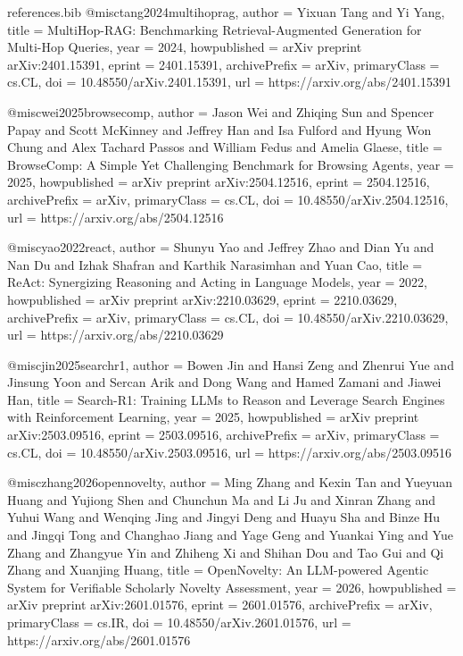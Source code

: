 \begin{filecontents*}{references.bib}
@misc{tang2024multihoprag,
  author        = {Yixuan Tang and Yi Yang},
  title         = {{MultiHop-RAG: Benchmarking Retrieval-Augmented Generation for Multi-Hop Queries}},
  year          = {2024},
  howpublished  = {arXiv preprint arXiv:2401.15391},
  eprint        = {2401.15391},
  archivePrefix = {arXiv},
  primaryClass  = {cs.CL},
  doi           = {10.48550/arXiv.2401.15391},
  url           = {https://arxiv.org/abs/2401.15391}
}

@misc{wei2025browsecomp,
  author        = {Jason Wei and Zhiqing Sun and Spencer Papay and Scott McKinney and Jeffrey Han and Isa Fulford and Hyung Won Chung and Alex Tachard Passos and William Fedus and Amelia Glaese},
  title         = {{BrowseComp: A Simple Yet Challenging Benchmark for Browsing Agents}},
  year          = {2025},
  howpublished  = {arXiv preprint arXiv:2504.12516},
  eprint        = {2504.12516},
  archivePrefix = {arXiv},
  primaryClass  = {cs.CL},
  doi           = {10.48550/arXiv.2504.12516},
  url           = {https://arxiv.org/abs/2504.12516}
}



@misc{yao2022react,
  author        = {Shunyu Yao and Jeffrey Zhao and Dian Yu and Nan Du and Izhak Shafran and Karthik Narasimhan and Yuan Cao},
  title         = {{ReAct: Synergizing Reasoning and Acting in Language Models}},
  year          = {2022},
  howpublished  = {arXiv preprint arXiv:2210.03629},
  eprint        = {2210.03629},
  archivePrefix = {arXiv},
  primaryClass  = {cs.CL},
  doi           = {10.48550/arXiv.2210.03629},
  url           = {https://arxiv.org/abs/2210.03629}
}

@misc{jin2025searchr1,
  author        = {Bowen Jin and Hansi Zeng and Zhenrui Yue and Jinsung Yoon and Sercan Arik and Dong Wang and Hamed Zamani and Jiawei Han},
  title         = {{Search-R1: Training LLMs to Reason and Leverage Search Engines with Reinforcement Learning}},
  year          = {2025},
  howpublished  = {arXiv preprint arXiv:2503.09516},
  eprint        = {2503.09516},
  archivePrefix = {arXiv},
  primaryClass  = {cs.CL},
  doi           = {10.48550/arXiv.2503.09516},
  url           = {https://arxiv.org/abs/2503.09516}
}



@misc{zhang2026opennovelty,
  author        = {Ming Zhang and Kexin Tan and Yueyuan Huang and Yujiong Shen and Chunchun Ma and Li Ju and Xinran Zhang and Yuhui Wang and Wenqing Jing and Jingyi Deng and Huayu Sha and Binze Hu and Jingqi Tong and Changhao Jiang and Yage Geng and Yuankai Ying and Yue Zhang and Zhangyue Yin and Zhiheng Xi and Shihan Dou and Tao Gui and Qi Zhang and Xuanjing Huang},
  title         = {{OpenNovelty: An LLM-powered Agentic System for Verifiable Scholarly Novelty Assessment}},
  year          = {2026},
  howpublished  = {arXiv preprint arXiv:2601.01576},
  eprint        = {2601.01576},
  archivePrefix = {arXiv},
  primaryClass  = {cs.IR},
  doi           = {10.48550/arXiv.2601.01576},
  url           = {https://arxiv.org/abs/2601.01576}
}


\end{filecontents*}
